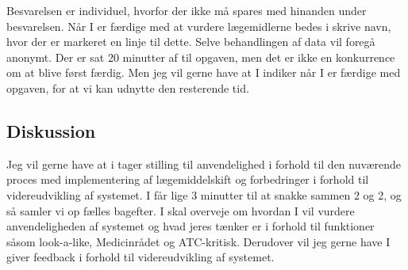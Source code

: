 Besvarelsen er individuel, hvorfor der ikke må spares med hinanden under besvarelsen. Når I er færdige med at vurdere lægemidlerne bedes i skrive navn, hvor der er markeret en linje til dette. Selve behandlingen af data vil foregå anonymt. Der er sat 20 minutter af til opgaven, men det er ikke en konkurrence om at blive først færdig. Men jeg vil gerne have at I indiker når I er færdige med opgaven, for at vi kan udnytte den resterende tid.

\subsection{Diskussion}
Jeg vil gerne have at i tager stilling til anvendelighed i forhold til den nuværende proces med implementering af lægemiddelskift og forbedringer i forhold til videreudvikling af systemet. I får lige 3 minutter til at snakke sammen 2 og 2, og så samler vi op fælles bagefter.  I skal overveje om hvordan I vil vurdere anvendeligheden af systemet og hvad jeres tænker er i forhold til funktioner såsom  look-a-like, Medicinrådet og ATC-kritisk. Derudover vil jeg gerne have I giver feedback i forhold til videreudvikling af systemet.

